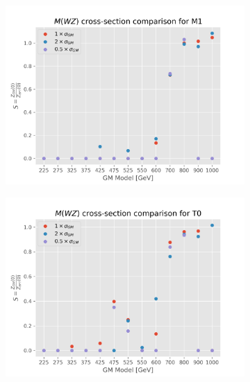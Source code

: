 \documentclass[../Bachelorarbeit.tex]{subfiles}
\begin{document}
\begin{figure}[h]
    \begin{subfigure}{0.45\textwidth}
        \includegraphics[width=\textwidth]{Plots/gm_relevanze/MWZ_comparision_M1.png}
    \end{subfigure}
    \begin{subfigure}{0.45\textwidth}
        \includegraphics[width=\textwidth]{Plots/gm_relevanze/MWZ_comparision_T0.png}
    \end{subfigure}
    \begin{subfigure}{0.45\textwidth}

\end{subfigure}
\end{figure}
\end{document}
